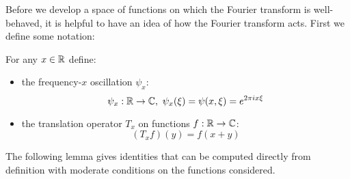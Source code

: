       Before we develop a space of functions on which the Fourier transform is well-behaved, it is helpful to have an idea of how the Fourier transform acts.
      First we define some notation:
      \begin{defn}
        For any $x\in\mathbb{R}$ define:
        \begin{itemize}
          \item the frequency-$x$ oscillation $\psi_x$:
            \begin{equation*}
              \psi_x:\mathbb{R}\rightarrow\mathbb{C},\ \psi_x(\xi) = \psi(x,\xi) = e^{2\pi i x \xi}
            \end{equation*}
          \item the translation operator $T_x$ on functions $f:\mathbb{R}\rightarrow\mathbb{C}$:
            \begin{equation*}
              (T_xf)(y) = f(x+y)
            \end{equation*}
        \end{itemize}
      \end{defn}
      The following lemma gives identities that can be computed directly from definition with moderate conditions on the functions considered.
